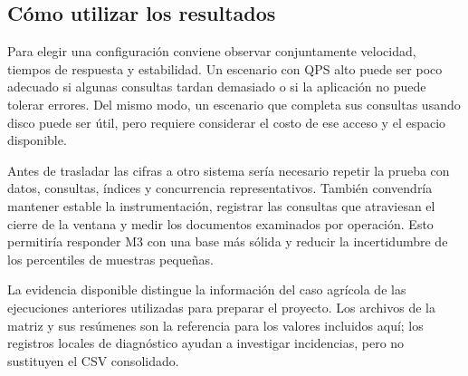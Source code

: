 \documentclass[12pt,letterpaper]{article}
\begin{document}
\subsection*{Cómo utilizar los resultados}
Para elegir una configuración conviene observar conjuntamente velocidad, tiempos de respuesta y estabilidad. Un escenario con QPS alto puede ser poco adecuado si algunas consultas tardan demasiado o si la aplicación no puede tolerar errores. Del mismo modo, un escenario que completa sus consultas usando disco puede ser útil, pero requiere considerar el costo de ese acceso y el espacio disponible.

Antes de trasladar las cifras a otro sistema sería necesario repetir la prueba con datos, consultas, índices y concurrencia representativos. También convendría mantener estable la instrumentación, registrar las consultas que atraviesan el cierre de la ventana y medir los documentos examinados por operación. Esto permitiría responder M3 con una base más sólida y reducir la incertidumbre de los percentiles de muestras pequeñas.

La evidencia disponible distingue la información del caso agrícola de las ejecuciones anteriores utilizadas para preparar el proyecto. Los archivos de la matriz y sus resúmenes son la referencia para los valores incluidos aquí; los registros locales de diagnóstico ayudan a investigar incidencias, pero no sustituyen el CSV consolidado.
\end{document}
